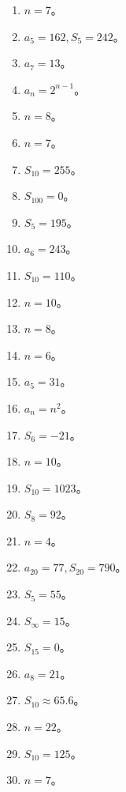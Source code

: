 \begin{enumerate}[label=\arabic*.]
    \item $n = 7$。
    \item $a_5 = 162, S_5 = 242$。
    \item $a_7 = 13$。
    \item $a_n = 2^{n-1}$。
    \item $n = 8$。
    \item $n = 7$。
    \item $S_{10} = 255$。
    \item $S_{100} = 0$。
    \item $S_5 = 195$。
    \item $a_6 = 243$。
    \item $S_{10} = 110$。
    \item $n = 10$。
    \item $n = 8$。
    \item $n = 6$。
    \item $a_5 = 31$。
    \item $a_n = n^2$。
    \item $S_6 = -21$。
    \item $n = 10$。
    \item $S_{10} = 1023$。
    \item $S_8 = 92$。
    \item $n = 4$。
    \item $a_{20} = 77, S_{20} = 790$。
    \item $S_5 = 55$。
    \item $S_\infty = 15$。
    \item $S_{15} = 0$。
    \item $a_8 = 21$。
    \item $S_{10} \approx 65.6$。
    \item $n = 22$。
    \item $S_{10} = 125$。
    \item $n = 7$。
\end{enumerate}

